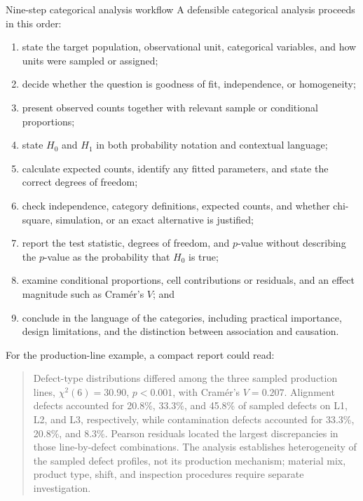 \begin{custombox}{Nine-step categorical analysis workflow}
A defensible categorical analysis proceeds in this order:
\begin{enumerate}
  \item state the target population, observational unit, categorical variables, and how units were sampled or assigned;
  \item decide whether the question is goodness of fit, independence, or homogeneity;
  \item present observed counts together with relevant sample or conditional proportions;
  \item state $H_0$ and $H_1$ in both probability notation and contextual language;
  \item calculate expected counts, identify any fitted parameters, and state the correct degrees of freedom;
  \item check independence, category definitions, expected counts, and whether chi-square, simulation, or an exact alternative is justified;
  \item report the test statistic, degrees of freedom, and $p$-value without describing the $p$-value as the probability that $H_0$ is true;
  \item examine conditional proportions, cell contributions or residuals, and an effect magnitude such as Cram\'er's $V$; and
  \item conclude in the language of the categories, including practical importance, design limitations, and the distinction between association and causation.
\end{enumerate}
\end{custombox}

For the production-line example, a compact report could read:

\begin{quote}
Defect-type distributions differed among the three sampled production lines, $\chi^2(6)=30.90$, $p<0.001$, with Cram\'er's $V=0.207$. Alignment defects accounted for 20.8\%, 33.3\%, and 45.8\% of sampled defects on L1, L2, and L3, respectively, while contamination defects accounted for 33.3\%, 20.8\%, and 8.3\%. Pearson residuals located the largest discrepancies in those line-by-defect combinations. The analysis establishes heterogeneity of the sampled defect profiles, not its production mechanism; material mix, product type, shift, and inspection procedures require separate investigation.
\end{quote}

